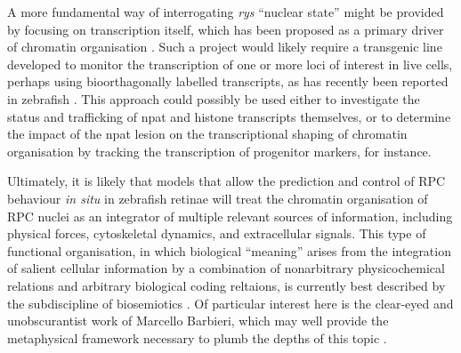 A more fundamental way of interrogating \textit{rys} ``nuclear state'' might be provided by focusing on transcription itself, which has been proposed as a primary driver of chromatin organisation \cite{Cook2018}. Such a project would likely require a transgenic line developed to monitor the transcription of one or more loci of interest in live cells, perhaps using bioorthagonally labelled transcripts, as has recently been reported in zebrafish \cite{Westerich2020}. This approach could possibly be used either to investigate the status and trafficking of npat and histone transcripts themselves, or to determine the impact of the npat lesion on the transcriptional shaping of chromatin organisation by tracking the transcription of progenitor markers, for instance.

Ultimately, it is likely that models that allow the prediction and control of RPC behaviour \textit{in situ} in zebrafish retinae will treat the chromatin organisation of RPC nuclei as an integrator of multiple relevant sources of information, including physical forces, cytoskeletal dynamics, and extracellular signals. This type of functional organisation, in which biological ``meaning'' arises from the integration of salient cellular information by a combination of nonarbitrary physicochemical relations and arbitrary biological coding reltaions, is currently best described by the subdiscipline of biosemiotics \cite{Hoffmeyer2008,Favareau2015,Hoffmeyer2015}. Of particular interest here is the clear-eyed and unobscurantist work of Marcello Barbieri, which may well provide the metaphysical framework necessary to plumb the depths of this topic \cite{Barbieri2015}.